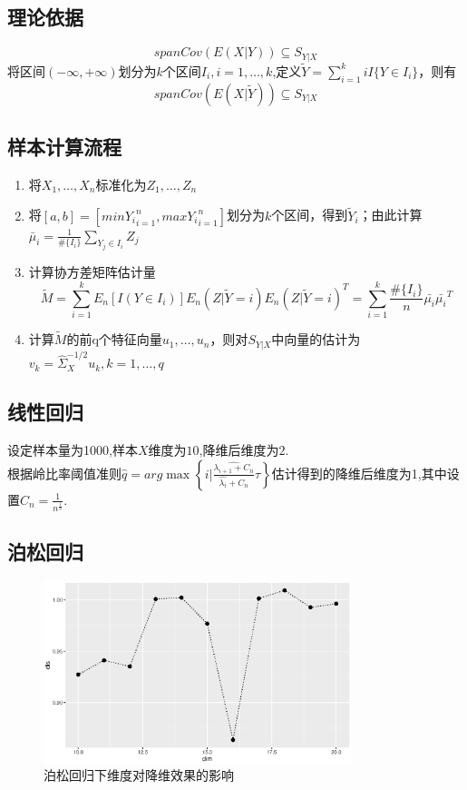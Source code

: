 \subsection{理论依据}
    \begin{equation*}
        span{Cov(E(X|Y))}\subseteq S_{Y|X}
    \end{equation*}
    将区间$(-\infty,+\infty)$划分为$k$个区间$I_i, i=1,\dots,k$,定义$\widetilde{Y}=\sum_{i=1}^kiI\{Y\in I_i\}$，则有
    \begin{equation*}
        span{Cov(E(X|\widetilde{Y}))}\subseteq S_{Y|X}
    \end{equation*}
\subsection{样本计算流程}
    \begin{enumerate}
        \item 将$X_1,\dots,X_n$标准化为$Z_1,\dots,Z_n$
        \item 将$[a,b]=[min{Y_i}_{i=1}^n,max{Y_i}_{i=1}^n]$划分为$k$个区间，得到$\widetilde{Y}_i$；由此计算$\bar{\mu}_i=\frac{1}{\#\{I_i\}}\sum_{Y_j\in I_i}Z_j$
        \item 计算协方差矩阵估计量$$\widetilde{M}=\sum_{i=1}^kE_n[I(Y\in I_i)] E_n(Z|\widetilde{Y}=i) E_n(Z|\widetilde{Y}=i)^T=\sum_{i=1}^k\frac{\#\{I_i\}}{n}\bar{\mu_i}\bar{\mu_i}^T$$
        \item 计算$\widetilde{M}$的前q个特征向量$u_1,\dots,u_n$，则对$S_{Y|X}$中向量的估计为$v_k=\hat{\Sigma}_{X}^{-1/2}u_k,k=1,\dots,q$
    \end{enumerate}

\subsection{线性回归}
    设定样本量为1000,样本$X$维度为$10$,降维后维度为$2$.\\
    根据岭比率阈值准则$\hat{q} = arg\max\left\{i|\frac{\hat{\lambda_{i+1}+C_n}}{\hat{\lambda_i}+C_n}\tau\right\}$估计得到的降维后维度为1,其中设置$C_n = \frac{1}{n^\frac{1}{3} }$.

    
    
\subsection{泊松回归}
    \begin{figure}[H]
        \centering
        \includegraphics[width=0.8\textwidth]{image/pois_sir.eps}
        \caption{泊松回归下维度对降维效果的影响}
    \end{figure}
    

